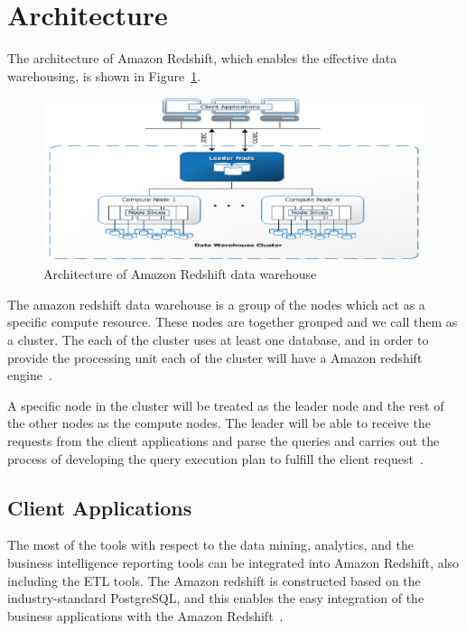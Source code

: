\section{Architecture}
\label{sa:archi}
	The architecture of Amazon Redshift, which enables the 
	effective data warehousing, is shown in 
	Figure~\ref{sa:archi}.

\begin{figure}[!ht]
\centering\includegraphics[width=\textwidth]{images/amazon-architecture.png}
\caption{Architecture of Amazon Redshift data 
warehouse~\cite{hid-sp18-412-Amazon_Redshift_architecture}}\label{sa:archi}
\end{figure}

	The amazon redshift data warehouse is a group of the nodes which
	act as a specific compute resource. These nodes are together grouped 
	and we call them as a cluster. The each of the cluster uses at 
	least one database, and in order to provide the processing unit 
	each of the cluster will have a Amazon redshift 
	engine~\cite{hid-sp18-412-Amazon_Redshift_architecture}.

	  A specific node in the cluster will be treated as the leader node and 
	  the rest of the other nodes as the compute nodes. The leader will 
	  be able to receive the requests from the client applications and
	  parse the queries and carries out the process of developing the 
	  query execution plan to fulfill the 
	  client request~\cite{hid-sp18-412-Amazon_Redshift_architecture}.
		
	\subsection{Client Applications}
	The most of the tools with respect to the data mining, analytics, 
	and the business intelligence reporting tools can be integrated into 
	Amazon Redshift, also including the ETL tools. The Amazon redshift is 
	constructed based on the industry-standard PostgreSQL, and this enables 
	the easy integration of the 
	business applications with the 
	Amazon Redshift~\cite{hid-sp18-412-Amazon_Redshift_architecture}.
        
